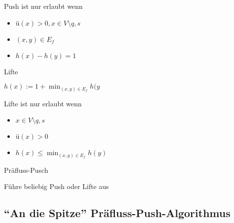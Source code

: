 Push ist nur erlaubt wenn 
	\begin{itemize}
		\item $ü(x) > 0, x \in V \setminus {q,s}$
		\item $(x,y) \in E_f$
		\item $h(x) - h(y) = 1$
	\end{itemize} 


\begin{algorithm}[H]
	\caption{Lifte}

	\Output{}
	\BlankLine

	$h(x) := 1+ \min_{(x,y) \in E_f}{h(y}$
\end{algorithm}

Lifte ist nur erlaubt wenn 
	\begin{itemize}
		\item $x \in V \setminus {q,s}$
		\item $ü(x) > 0$
		\item $h(x) \leqslant \min_{(x,y) \in E_f}{h(y)}$
	\end{itemize} 


\begin{algorithm}[H]
	\caption{Präfluss-Pusch}

	\BlankLine

	 {Führe beliebig Push oder Lifte aus}
\end{algorithm}

\subsection{"`An die Spitze"' Präfluss-Push-Algorithmus}

